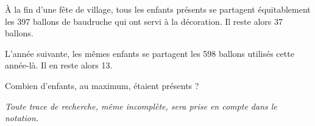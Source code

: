 
\medskip

À la fin d'une fête de village, tous les enfants présents se partagent équitablement les 397
ballons de baudruche qui ont servi à la décoration. Il reste alors 37 ballons. 

\smallskip

L'année suivante, les mêmes enfants se partagent les 598 ballons utilisés cette année-là.
Il en reste alors 13.

\smallskip

Combien d'enfants, au maximum, étaient présents ?

\emph{Toute trace de recherche, même incomplète, sera prise en compte dans le notation.}

\vspace{0,5cm}

